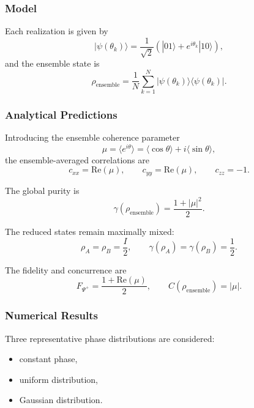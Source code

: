 \documentclass[a4paper]{article}
\begin{document}

\subsubsection{Model}

Each realization is given by
\[
|\psi(\theta_k)\rangle
=
\frac{1}{\sqrt{2}}
\left(
|01\rangle + e^{i\theta_k}|10\rangle
\right),
\]
and the ensemble state is
\[
\rho_{\mathrm{ensemble}}
=
\frac{1}{N}
\sum_{k=1}^{N}
|\psi(\theta_k)\rangle\langle \psi(\theta_k)|.
\]


\subsubsection{Analytical Predictions}

Introducing the ensemble coherence parameter
\[
\mu = \langle e^{i\theta} \rangle
=
\langle \cos\theta \rangle + i \langle \sin\theta \rangle,
\]
the ensemble-averaged correlations are
\[
c_{xx} = \mathrm{Re}(\mu),\qquad
c_{yy} = \mathrm{Re}(\mu),\qquad
c_{zz} = -1.
\]

The global purity is
\[
\gamma(\rho_{\mathrm{ensemble}})
=
\frac{1 + |\mu|^2}{2}.
\]

The reduced states remain maximally mixed:
\[
\rho_A = \rho_B = \frac{I}{2}, 
\qquad
\gamma(\rho_A)=\gamma(\rho_B)=\frac{1}{2}.
\]

The fidelity and concurrence are
\[
F_{\Psi^+}
=
\frac{1 + \mathrm{Re}(\mu)}{2},
\qquad
C(\rho_{\mathrm{ensemble}}) = |\mu|.
\]


\subsubsection{Numerical Results}

Three representative phase distributions are considered:
\begin{itemize}
\item constant phase,
\item uniform distribution,
\item Gaussian distribution.
\end{itemize}
\end{document}
